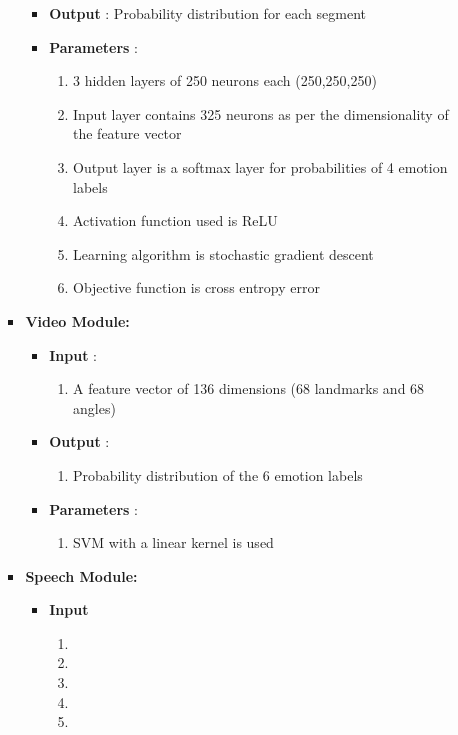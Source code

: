 \documentclass[oneside,a4paper,12pt]{report}
\begin{document}
\begin{normalsize}
\begin{itemize}
\begin{itemize}
\begin{itemize}
\begin{itemize}
			\item \textbf{Output} : Probability distribution for each segment \newline
			\item \textbf{Parameters} :
			\begin{enumerate}
				\item 3 hidden layers of 250 neurons each (250,250,250)
				\item Input layer contains 325 neurons as per the dimensionality of the feature vector
				\item Output layer is a softmax layer for probabilities of 4 emotion labels
				\item Activation function used is ReLU
				\item Learning algorithm is stochastic gradient descent
				\item Objective function is cross entropy error
			\end{enumerate}
		\end{itemize}
		\vspace{10mm}
		\item \textbf{Video Module: }
		\begin{itemize}
			\item \textbf{Input} :
			\begin{enumerate}
				\item A feature vector of 136 dimensions (68 landmarks and 68 angles)
			\end{enumerate}
		
			\item \textbf{Output} :
			\begin{enumerate}
			\item Probability distribution of the 6 emotion labels
			\end{enumerate}
	
			\item \textbf{Parameters} :
			\begin{enumerate}
			\item SVM with a linear kernel is used 
			\end{enumerate} 
		\end{itemize}
		\vspace{10mm}
		\item \textbf{Speech Module: }
	\begin{itemize}
		\item \textbf{Input} 
		\begin{enumerate}
			\item 
			\item
			\item
			\item
			\item
		\end{enumerate}
		

\end{itemize}
\end{itemize}
\end{itemize}
\end{itemize}
\end{normalsize}
\end{document}
